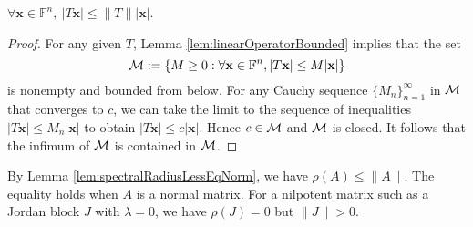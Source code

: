 \begin{coro}
  \label{coro:2normLessThanOpNorm}
  $\forall \mathbf{x}\in \mathbb{F}^n,\
  |T\mathbf{x}| \le \|T\||\mathbf{x}|$.
\end{coro}
\begin{proof}
  For any given $T$,
   Lemma \ref{lem:linearOperatorBounded} implies that
   the set
   \begin{displaymath}
     {\cal M}:=\left\{ M\ge 0 : \forall \mathbf{x}\in \mathbb{F}^n,
       |T\mathbf{x}| \le M |\mathbf{x}| \right\}
   \end{displaymath}
  is nonempty and bounded from below.
  For any Cauchy sequence $\{M_n\}_{n=1}^{\infty}$ in ${\cal M}$
  that converges to $c$,
  we can take the limit to the sequence of inequalities
  $|T\mathbf{x}|\le M_n |\mathbf{x}|$
  to obtain $|T\mathbf{x}|\le c |\mathbf{x}|$.
  Hence $c\in {\cal M}$ and ${\cal M}$ is closed.
  It follows that the infimum of ${\cal M}$
  is contained in ${\cal M}$.
\end{proof}

\begin{rem}
  By Lemma \ref{lem:spectralRadiusLessEqNorm},
  we have $\rho(A)\le \|A\|$.
  The equality holds when $A$ is a normal matrix.
  For a nilpotent matrix such as a Jordan block $J$
  with $\lambda=0$,
  we have $\rho(J)=0$
  but $\|J\|>0$.
\end{rem}


